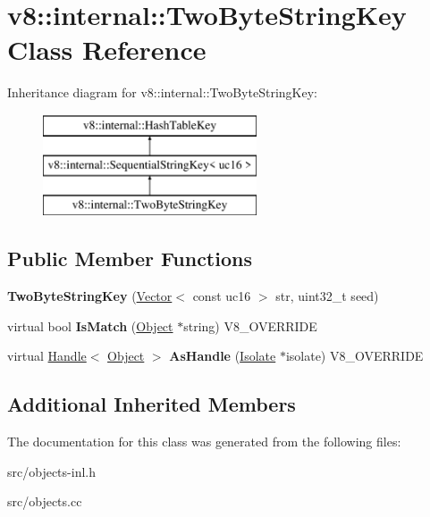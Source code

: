 \hypertarget{classv8_1_1internal_1_1_two_byte_string_key}{}\section{v8\+:\+:internal\+:\+:Two\+Byte\+String\+Key Class Reference}
\label{classv8_1_1internal_1_1_two_byte_string_key}
Inheritance diagram for v8\+:\+:internal\+:\+:Two\+Byte\+String\+Key\+:\begin{figure}[H]
\begin{center}
\leavevmode
\includegraphics[height=3.000000cm]{classv8_1_1internal_1_1_two_byte_string_key}
\end{center}
\end{figure}
\subsection*{Public Member Functions}
\begin{DoxyCompactItemize}
\item 
\hypertarget{classv8_1_1internal_1_1_two_byte_string_key_ad3b10f868f603fcd025ee048912b940d}{}{\bfseries Two\+Byte\+String\+Key} (\hyperlink{classv8_1_1internal_1_1_vector}{Vector}$<$ const uc16 $>$ str, uint32\+\_\+t seed)\label{classv8_1_1internal_1_1_two_byte_string_key_ad3b10f868f603fcd025ee048912b940d}

\item 
\hypertarget{classv8_1_1internal_1_1_two_byte_string_key_a3dac3b05b7f495d5be749a0fc6169265}{}virtual bool {\bfseries Is\+Match} (\hyperlink{classv8_1_1internal_1_1_object}{Object} $\ast$string) V8\+\_\+\+O\+V\+E\+R\+R\+I\+D\+E\label{classv8_1_1internal_1_1_two_byte_string_key_a3dac3b05b7f495d5be749a0fc6169265}

\item 
\hypertarget{classv8_1_1internal_1_1_two_byte_string_key_af1fb2037f17f192e3ba8ebfb2db6ede6}{}virtual \hyperlink{classv8_1_1internal_1_1_handle}{Handle}$<$ \hyperlink{classv8_1_1internal_1_1_object}{Object} $>$ {\bfseries As\+Handle} (\hyperlink{classv8_1_1internal_1_1_isolate}{Isolate} $\ast$isolate) V8\+\_\+\+O\+V\+E\+R\+R\+I\+D\+E\label{classv8_1_1internal_1_1_two_byte_string_key_af1fb2037f17f192e3ba8ebfb2db6ede6}

\end{DoxyCompactItemize}
\subsection*{Additional Inherited Members}


The documentation for this class was generated from the following files\+:\begin{DoxyCompactItemize}
\item 
src/objects-\/inl.\+h\item 
src/objects.\+cc\end{DoxyCompactItemize}
